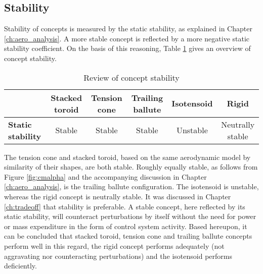 \subsection{Stability}
Stability of concepts is measured by the static stability, as explained in Chapter \ref{ch:aero_analysis}. A more stable concept is reflected by a more negative static stability coefficient. On the basis of this reasoning, Table \ref{tab:stab} gives an overview of concept stability.

\begin{table}[h]
\caption{Review of concept stability}
\hspace{-10mm}
\begin{tabular}{|p{2.5cm}|c|c|c|c|c|}
\hline
\textbf{}                          & \textbf{Stacked toroid} & \textbf{Tension cone} & \textbf{Trailing ballute} & \textbf{Isotensoid} & \textbf{Rigid} \\ \hline
\textbf{Static stability} &\cellcolor{green!70} Stable  &\cellcolor{green!70}  Stable   &\cellcolor{green!70} Stable & \cellcolor{red!60}   Unstable          &\cellcolor{yellow!75} Neutrally stable                 \\ \hline
\end{tabular}
\label{tab:stab}
\end{table}

The tension cone and stacked toroid, based on the same aerodynamic model by similarity of their shapes, are both stable. Roughly equally stable, as follows from Figure \ref{fig:cmalpha} and the accompanying discussion in Chapter \ref{ch:aero_analysis}, is the trailing ballute configuration. The isotensoid is unstable, whereas the rigid concept is neutrally stable. It was discussed in Chapter \ref{ch:tradeoff} that stability is preferable. A stable concept, here reflected by its static stability, will counteract perturbations by itself without the need for power or mass expenditure in the form of control system activity. Based hereupon, it can be concluded that stacked toroid, tension cone and trailing ballute concepts perform well in this regard, the rigid concept performs adequately (not aggravating nor counteracting perturbations) and the isotensoid performs deficiently. 

